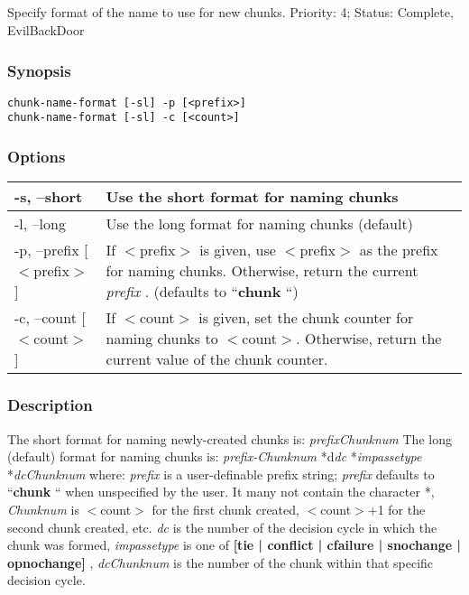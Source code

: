 \subsection{}
\label{chunk-name-format}
Specify format of the name to use for new chunks. 
 Priority: 4; Status: Complete, EvilBackDoor
\subsubsection*{Synopsis}
\begin{verbatim}
chunk-name-format [-sl] -p [<prefix>]
chunk-name-format [-sl] -c [<count>]
\end{verbatim}
\subsubsection*{Options}
\begin{tabular}{|l|l|}
\hline 
 -s, --short  & Use the short format for naming chunks  \\
 \hline 
 -l, --long  & Use the long format for naming chunks (default)  \\
 \hline 
 -p, --prefix [$<$prefix$>$]  & If $<$prefix$>$ is given, use $<$prefix$>$ as the prefix for naming chunks. Otherwise, return the current \emph{prefix}
. (defaults to ``\textbf{chunk}
``)  \\
 \hline 
 -c, --count [$<$count$>$]  & If $<$count$>$ is given, set the chunk counter for naming chunks to $<$count$>$. Otherwise, return the current value of the chunk counter.  \\
 \hline 
\end{tabular}
\subsubsection*{Description}
 The short format for naming newly-created chunks is: 
 \emph{prefixChunknum}
 The long (default) format for naming chunks is: 
 \emph{prefix-Chunknum}
*d\emph{dc}
*\emph{impassetype}
*\emph{dcChunknum}
 where: 
 \emph{prefix}
 is a user-definable prefix string; \emph{prefix}
 defaults to ``\textbf{chunk}
`` when unspecified by the user. It many not contain the character *, 
 \emph{Chunknum}
 is $<$count$>$ for the first chunk created, $<$count$>$+1 for the second chunk created, etc. 
 \emph{dc}
 is the number of the decision cycle in which the chunk was formed, 
 \emph{impassetype}
 is one of \textbf{[tie | conflict | cfailure | snochange | opnochange]}
, 
 \emph{dcChunknum}
 is the number of the chunk within that specific decision cycle. 
